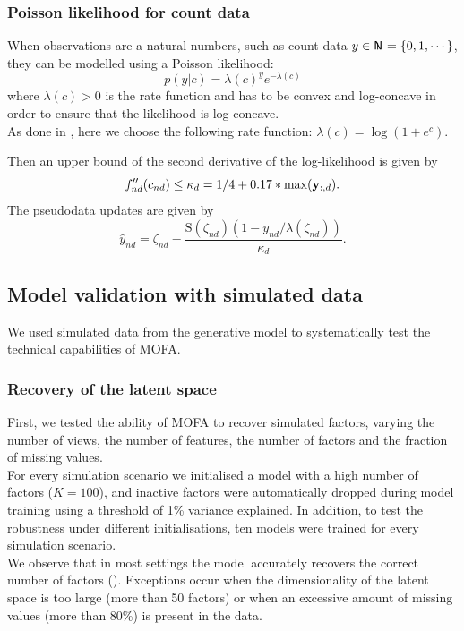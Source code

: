 \subsubsection*{Poisson likelihood for count data}
When observations are a natural numbers, such as count data $y \in \N = \{0,1,\cdots\}$, they can be modelled using a Poisson likelihood:
\begin{equation*}
p(y|c) = \lambda(c)^y e^{-\lambda(c)}
\end{equation*}
where $\lambda(c)>0$ is the rate function and has to be convex and log-concave in order to ensure that the likelihood is log-concave.\\
As done in \cite{seeger}, here we choose the following rate function: $\lambda(c)=\log(1+e^c)$.

Then an upper bound of the second derivative of the log-likelihood is given by
\begin{equation*}
f''_{nd}(c_{nd}) \leq \kappa_d = 1/4 + 0.17*\max({\bf y}_{:,d}).
\end{equation*}
The pseudodata updates are given by
\begin{equation*}
\hat{y}_{nd} = \zeta_{nd} - \frac{\mathrm{S}(\zeta_{nd})(1-y_{nd}/\lambda(\zeta_{nd}))}{\kappa_d}.
\end{equation*}


\subsection{Model validation with simulated data} \label{section:mofa_simulated}
We used simulated data from the generative model to systematically test the technical capabilities of MOFA.





\subsubsection{Recovery of the latent space}
First, we tested the ability of MOFA to recover simulated factors, varying the number of views, the number of features, the number of factors and the fraction of missing values.\\ 
For every simulation scenario we initialised a model with a high number of factors ($K=100$), and inactive factors were automatically dropped during model training using a threshold of 1\% variance explained. In addition, to test the robustness under different initialisations, ten models were trained for every simulation scenario.\\
We observe that in most settings the model accurately recovers the correct number of factors (). Exceptions occur when the dimensionality of the latent space is too large (more than 50 factors) or when an excessive amount of missing values (more than 80\%) is present in the data.

